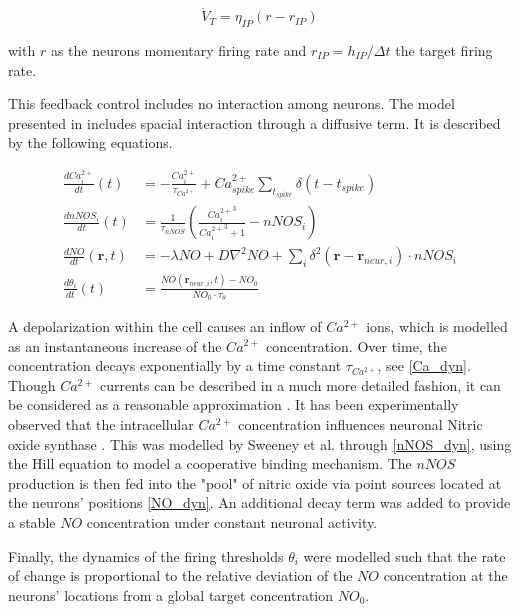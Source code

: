 \documentclass[10pt,a4paper]{article}
\begin{document}
\begin{equation}
\dot{V}_T = \eta_{IP}(r-r_{IP}) \label{can_hom_rate}
\end{equation}
 
with $r$ as the neurons momentary firing rate and $r_{IP}=h_{IP}/\Delta t$ the target firing rate.
 
This feedback control includes no interaction among neurons. The model presented in \cite{Sweeney_Paper} includes spacial interaction through a diffusive term. It is described by the following equations.

\begin{align}
\frac{dCa^{2+}_i}{dt}(t) &= -\frac{Ca^{2+}_i}{\tau_{Ca^{2+}}} + Ca^{2+}_{spike} \sum_{t_{spike}} \delta(t-t_{spike}) \label{Ca_dyn}\\
\frac{dnNOS_i}{dt}(t) &= \frac{1}{\tau_{nNOS}} \left(  \frac{{Ca^{2+}_i}^3}{{Ca^{2+}_i}^3+1} - nNOS_i \right) \label{nNOS_dyn}\\
\frac{dNO}{dt}(\mathbf{r},t)&=-\lambda NO + D \nabla^2 NO + \sum_{i} \delta^2(\mathbf{r}-\mathbf{r}_{neur,i})\cdot nNOS_i \label{NO_dyn}\\
\frac{d\theta_i}{dt}(t) &= \frac{NO(\mathbf{r}_{neur,i},t)-NO_0}{NO_0\cdot\tau_{\theta}} \label{Theta_dyn}
\end{align}

A depolarization within the cell causes an inflow of $Ca^{2+}$ ions, which is modelled as an instantaneous increase of the $Ca^{2+}$ concentration. Over time, the concentration decays exponentially by a time constant $\tau_{Ca^{2+}}$, see \eqref{Ca_dyn}. Though $Ca^{2+}$ currents can be described in a much more detailed fashion, it can be considered as a reasonable approximation \cite[p.~198-203]{Theor_Neur_Dayan}. It has been experimentally observed that the intracellular $Ca^{2+}$ concentration influences neuronal Nitric oxide synthase \cite{Bredt_Snyder_NO}. This was modelled by Sweeney et al. through \eqref{nNOS_dyn}, using the Hill equation \cite{Hill_Equ} to model a cooperative binding mechanism. The $nNOS$ production is then fed into the "pool" of nitric oxide via point sources located at the neurons' positions \eqref{NO_dyn}. An additional decay term was added to provide a stable $NO$ concentration under constant neuronal activity.

Finally, the dynamics of the firing thresholds $\theta_i$ were modelled such that the rate of change is proportional to the relative deviation of the $NO$ concentration at the neurons' locations from a global target concentration $NO_0$.
\end{document}
